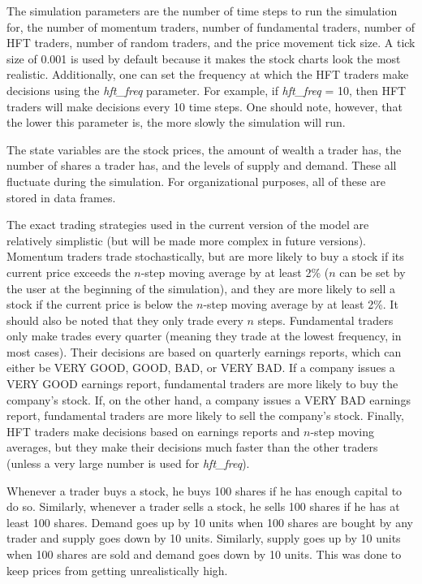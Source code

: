 \documentclass[12pt]{article}
\begin{document}
The simulation parameters are the number of time steps to run the simulation for, the number of momentum traders, number of fundamental traders, number of HFT traders, number of random traders, and the price movement tick size. A tick size of 0.001 is used by default because it makes the stock charts look the most realistic. Additionally, one can set the frequency at which the HFT traders make decisions using the \textit{hft\_freq} parameter. For example, if \textit{hft\_freq} = 10, then HFT traders will make decisions every 10 time steps. One should note, however, that the lower this parameter is, the more slowly the simulation will run. 

The state variables are the stock prices, the amount of wealth a trader has, the number of shares a trader has, and the levels of supply and demand. These all fluctuate during the simulation. For organizational purposes, all of these are stored in data frames. 

The exact trading strategies used in the current version of the model are relatively simplistic (but will be made more complex in future versions). Momentum traders trade stochastically, but are more likely to buy a stock if its current price exceeds the $n$-step moving average by at least 2\% ($n$ can be set by the user at the beginning of the simulation), and they are more likely to sell a stock if the current price is below the $n$-step moving average by at least 2\%. It should also be noted that they only trade every $n$ steps. Fundamental traders only make trades every quarter (meaning they trade at the lowest frequency, in most cases). Their decisions are based on quarterly earnings reports, which can either be VERY GOOD, GOOD, BAD, or VERY BAD. If a company issues a VERY GOOD earnings report, fundamental traders are more likely to buy the company's stock. If, on the other hand, a company issues a VERY BAD earnings report, fundamental traders are more likely to sell the company's stock. Finally, HFT traders make decisions based on earnings reports and $n$-step moving averages, but they make their decisions much faster than the other traders (unless a very large number is used for \textit{hft\_freq}).

Whenever a trader buys a stock, he buys 100 shares if he has enough capital to do so. Similarly, whenever a trader sells a stock, he sells 100 shares if he has at least 100 shares. Demand goes up by 10 units when 100 shares are bought by any trader and supply goes down by 10 units. Similarly, supply goes up by 10 units when 100 shares are sold and demand goes down by 10 units. This was done to keep prices from getting unrealistically high. 
\end{document}
